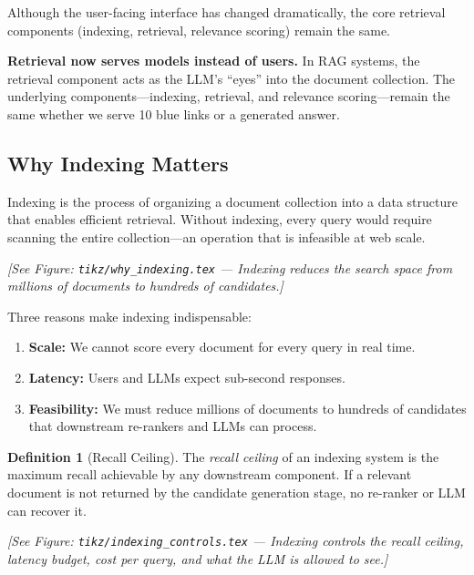 \documentclass[aspectratio=169]{beamer} \usetheme{TUDelft} %
\theoremstyle{definition}
\newtheorem{definition}{Definition}[section]
\theoremstyle{plain}
\begin{document}
Although the user-facing interface has changed dramatically, the core retrieval components (indexing, retrieval, relevance scoring) remain the same.

\begin{keytakeaway}
\textbf{Retrieval now serves models instead of users.} In RAG systems, the retrieval component acts as the LLM's ``eyes'' into the document collection. The underlying components---indexing, retrieval, and relevance scoring---remain the same whether we serve 10 blue links or a generated answer.
\end{keytakeaway}


\subsection{Why Indexing Matters}

Indexing is the process of organizing a document collection into a data structure that enables efficient retrieval. Without indexing, every query would require scanning the entire collection---an operation that is infeasible at web scale.

\begin{center}
\textit{[See Figure: \texttt{tikz/why\_indexing.tex} --- Indexing reduces the search space from millions of documents to hundreds of candidates.]}
\end{center}

Three reasons make indexing indispensable:
\begin{enumerate}
    \item \textbf{Scale:} We cannot score every document for every query in real time.
    \item \textbf{Latency:} Users and LLMs expect sub-second responses.
    \item \textbf{Feasibility:} We must reduce millions of documents to hundreds of candidates that downstream re-rankers and LLMs can process.
\end{enumerate}

\begin{definition}[Recall Ceiling]
\label{def:recall-ceiling}
The \emph{recall ceiling} of an indexing system is the maximum recall achievable by any downstream component. If a relevant document is not returned by the candidate generation stage, no re-ranker or LLM can recover it.
\end{definition}

\begin{center}
\textit{[See Figure: \texttt{tikz/indexing\_controls.tex} --- Indexing controls the recall ceiling, latency budget, cost per query, and what the LLM is allowed to see.]}
\end{center}
\end{document}
